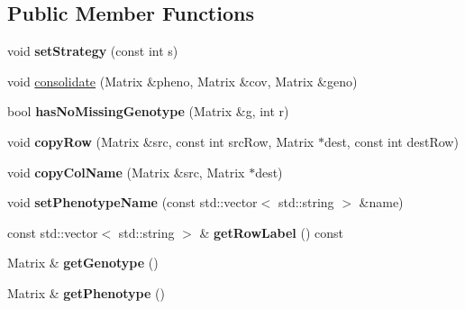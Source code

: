 \subsection*{Public Member Functions}
\begin{DoxyCompactItemize}
\item 
\hypertarget{classDataConsolidator_aaf864962320e2fa28fc345c646426d47}{void {\bfseries set\-Strategy} (const int s)}\label{classDataConsolidator_aaf864962320e2fa28fc345c646426d47}

\item 
void \hyperlink{classDataConsolidator_acc7e1257797598cb69db26dedbf909e7}{consolidate} (Matrix \&pheno, Matrix \&cov, Matrix \&geno)
\item 
\hypertarget{classDataConsolidator_a1e3186b079b05bb9484e787a1ec86288}{bool {\bfseries has\-No\-Missing\-Genotype} (Matrix \&g, int r)}\label{classDataConsolidator_a1e3186b079b05bb9484e787a1ec86288}

\item 
\hypertarget{classDataConsolidator_a486805b59a97e99bd52dfa62552b9664}{void {\bfseries copy\-Row} (Matrix \&src, const int src\-Row, Matrix $\ast$dest, const int dest\-Row)}\label{classDataConsolidator_a486805b59a97e99bd52dfa62552b9664}

\item 
\hypertarget{classDataConsolidator_ae8e8098f431f72d34065bf63c2bc72ab}{void {\bfseries copy\-Col\-Name} (Matrix \&src, Matrix $\ast$dest)}\label{classDataConsolidator_ae8e8098f431f72d34065bf63c2bc72ab}

\item 
\hypertarget{classDataConsolidator_a02f8da2a937e773627471e9c8efe0a3f}{void {\bfseries set\-Phenotype\-Name} (const std\-::vector$<$ std\-::string $>$ \&name)}\label{classDataConsolidator_a02f8da2a937e773627471e9c8efe0a3f}

\item 
\hypertarget{classDataConsolidator_a3e1b9bdaa8170965cfb48203d95fb2cb}{const std\-::vector$<$ std\-::string $>$ \& {\bfseries get\-Row\-Label} () const }\label{classDataConsolidator_a3e1b9bdaa8170965cfb48203d95fb2cb}

\item 
\hypertarget{classDataConsolidator_a07a010120f96b5e007f0437eec5a0057}{Matrix \& {\bfseries get\-Genotype} ()}\label{classDataConsolidator_a07a010120f96b5e007f0437eec5a0057}

\item 
\hypertarget{classDataConsolidator_a80a1c89b99b485c693e992bbabe88111}{Matrix \& {\bfseries get\-Phenotype} ()}\label{classDataConsolidator_a80a1c89b99b485c693e992bbabe88111}


\end{DoxyCompactItemize}
